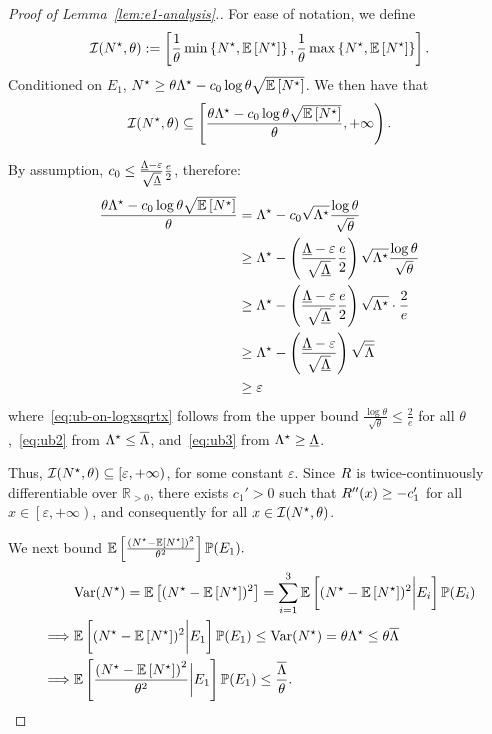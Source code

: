 \documentclass[12pt]{article}
\begin{document}
\begin{proof}[Proof of Lemma~\ref{lem:e1-analysis}.]
For ease of notation, we define $$\mathcal{I}({N}^\star,\theta) := \left[\frac1\theta\min\left\{{N}^\star,{\mathbb{E}\left[{N}^\star\right]}\right\},\frac1\theta\max\left\{{{N}^\star},{\mathbb{E}\left[{N}^\star\right]}\right\}\right].$$ Conditioned on $E_1$, ${N}^\star \geq \theta\Lambda^\star-c_0\log\theta\sqrt{\mathbb{E}\left[{N}^\star\right]}$. We then have that  $$\mathcal{I}({N}^\star,\theta) \subseteq \left[\frac{\theta\Lambda^\star-{c_0}\log\theta\sqrt{\mathbb{E}\left[{N}^\star\right]}}{\theta},+\infty\right).$$

By assumption, $c_0 \leq \frac{\underline{\Lambda}-\varepsilon}{\sqrt{\underline{\Lambda}}}\frac{e}{2}$, therefore:
\begin{align}
    \frac{\theta\Lambda^\star-{c_0}\log\theta\sqrt{\mathbb{E}\left[{N}^\star\right]}}{\theta} &= \Lambda^\star-c_0\sqrt{\Lambda^\star}\frac{\log\theta}{\sqrt\theta}\notag \\&\geq \Lambda^\star - \left(\frac{\underline{\Lambda}-\varepsilon}{\sqrt{\underline{\Lambda}}}\frac{e}{2}\right)\sqrt{\Lambda^\star}\frac{\log\theta}{\sqrt\theta}\notag\\ &\geq \Lambda^\star - \left(\frac{\underline{\Lambda}-\varepsilon}{\sqrt{\underline{\Lambda}}}\frac{e}{2}\right)\sqrt{\Lambda^\star}\cdot\frac2e \label{eq:ub-on-logxsqrtx} \\
    &\geq\Lambda^\star - \left(\frac{\underline{\Lambda}-\varepsilon}{\sqrt{\underline{\Lambda}}}\right)\sqrt{\overline{\Lambda}} \label{eq:ub2} \\
    &\geq \varepsilon \label{eq:ub3}
\end{align}
where~\eqref{eq:ub-on-logxsqrtx} follows from the upper bound $\frac{\log\theta}{\sqrt{\theta}} \leq \frac2e$ for all $\theta$,~\eqref{eq:ub2} from $\Lambda^\star \leq \overline{\Lambda}$, and~\eqref{eq:ub3} from $\Lambda^\star \geq \underline{\Lambda}$.



Thus, $\mathcal{I}({N}^\star,\theta) \subseteq \left[\varepsilon,+\infty\right)$, for some constant $\varepsilon$. Since $R$ is twice-continuously differentiable over $\mathbb{R}_{>0}$, there exists $c_1' > 0$ such that $R''(x) \geq - c_1'$ for all $x \in \left[\varepsilon,+\infty\right)$, and consequently for all $x \in \mathcal{I}({N}^\star,\theta)$.

We next bound $\mathbb{E}\left[\frac{\left({N}^\star-\mathbb{E}\left[{N}^\star\right]\right)^2}{\theta^2}\right]\mathbb{P}(E_1).$
\begin{align*}
     &\text{Var}({N}^\star)= \mathbb{E}\left[({N}^\star-\mathbb{E}\left[{N}^\star\right])^2\right] = \sum_{i=1}^3 \mathbb{E}\left[({N}^\star-\mathbb{E}\left[{N}^\star\right])^2\bigg{|}E_i\right]\mathbb{P}(E_i) \\
     \implies &\mathbb{E}\left[({N}^\star-\mathbb{E}\left[{N}^\star\right])^2\bigg{|}E_1\right]\mathbb{P}(E_1)\leq \text{Var}({N}^\star) = \theta\Lambda^\star \leq \theta\overline{\Lambda} \\
     \implies &\mathbb{E}\left[\frac{\left({N}^\star-\mathbb{E}\left[{N}^\star\right]\right)^2}{\theta^2}\bigg{|} E_1
     \right]\mathbb{P}(E_1) \leq \frac{\overline{\Lambda}}{\theta}.
\end{align*}


\end{proof}
\end{document}
